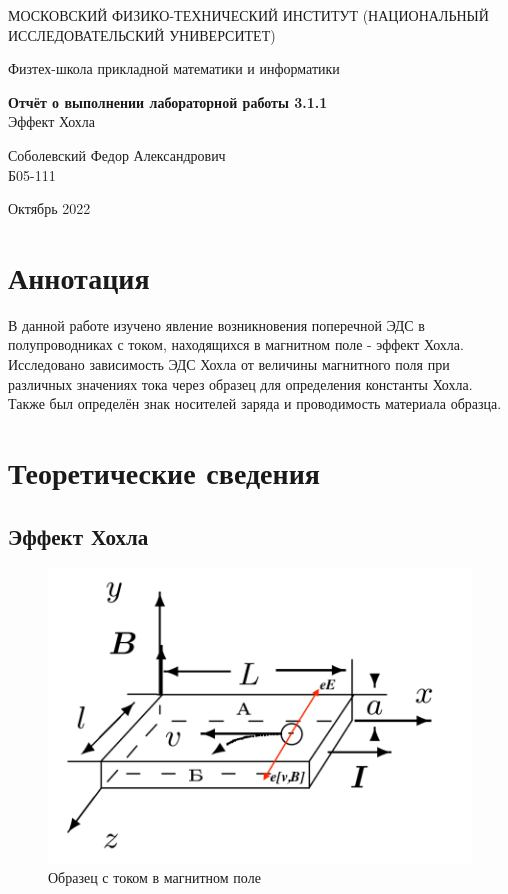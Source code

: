 \documentclass[a4paper,12pt]{article} %
\date{\today}
\begin{document}
\begin{titlepage}
	\begin{center}
		{\large МОСКОВСКИЙ ФИЗИКО-ТЕХНИЧЕСКИЙ ИНСТИТУТ (НАЦИОНАЛЬНЫЙ ИССЛЕДОВАТЕЛЬСКИЙ УНИВЕРСИТЕТ)}
	\end{center}
	\begin{center}
		{\large Физтех-школа прикладной математики и информатики}
	\end{center}
	
	
	\vspace{4.5cm}
	{\huge
		\begin{center}
			{\bf Отчёт о выполнении лабораторной работы 3.1.1}\\
			Эффект Хохла
		\end{center}
	}
	\vspace{1cm}
	\begin{center}
		{\large Соболевский Федор Александрович \\
			\vspace{0.2cm}
			Б05-111}
	\end{center}
	\vspace{8cm}
	\begin{center}
		Октябрь 2022
	\end{center}
\end{titlepage}

\section{Аннотация}

В данной работе изучено явление возникновения поперечной ЭДС в полупроводниках с током, находящихся в магнитном поле - эффект Хохла. Исследовано зависимость ЭДС Хохла от величины магнитного поля при различных значениях тока через образец для определения константы Хохла. Также был определён знак носителей заряда и проводимость материала образца.

\section{Теоретические сведения}

\subsection{Эффект Хохла}

\begin{figure}[h]
\centering
    \includegraphics[width=0.7\linewidth]{current.png}
    \caption{Образец с током в магнитном поле}
    \label{fig:current}
\end{figure}
\end{document}
